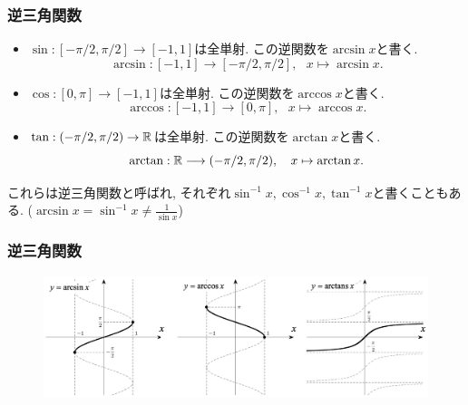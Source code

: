 \begin{frame}
\frametitle{逆三角関数}

\begin{itemize}
\item $\sin:[-\pi/2,\pi/2]\rightarrow [-1,1]$は全単射. 
この逆関数を$\arcsin x$と書く. 
$$
\arcsin: [-1,1] \longrightarrow [-\pi/2,\pi/2], \ \ \ x \mapsto \arcsin x. 
$$
\item $\cos:[0,\pi]\rightarrow [-1,1]$は全単射. 
この逆関数を$\arccos x$と書く. 
$$
\arccos: [-1,1] \longrightarrow [0,\pi], \ \ \ x \mapsto \arccos x. 
$$
\item $\tan:(-\pi/2,\pi/2)\rightarrow \mathbb{R}$は全単射. 
この逆関数を$\arctan x$と書く. 
$$
\arctan: \mathbb{R} \longrightarrow (-\pi/2,\pi/2), \ \ \ x \mapsto \arctan x. 
$$
\end{itemize}
これらは逆三角関数と呼ばれ, それぞれ$\sin^{-1}x, \cos^{-1}x,\tan^{-1}x$と書くこともある. 
($\arcsin x = \sin^{-1}x \neq \frac{1}{\sin x}$)




\end{frame}





\begin{frame}
\frametitle{逆三角関数}



 \begin{figure}[htbp]
 \begin{center} 
  \includegraphics[width=120mm]{calculus6/inv_trig.png}
 \end{center}
\end{figure}


\end{frame}




